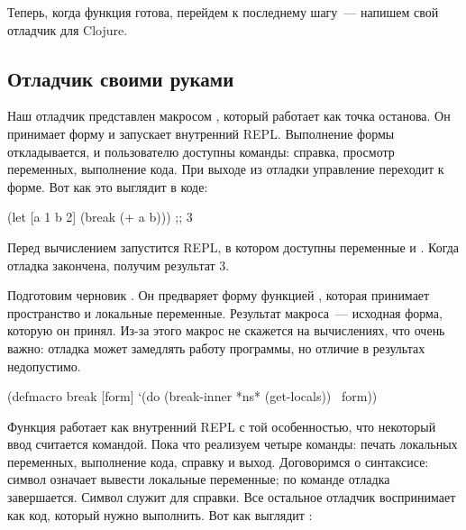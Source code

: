 \begin{english}
  \begin{clojure}
  \end{clojure}
\end{english}

Теперь, когда функция  готова, перейдем к последнему шагу~--- напишем свой отладчик для Clojure.

\subsection{Отладчик своими руками}


\label{section-own-debugger}


Наш отладчик представлен макросом , который работает как точка останова. Он принимает форму и запускает внутренний REPL. Выполнение формы откладывается, и пользователю доступны команды: справка, просмотр переменных, выполнение кода. При выходе из отладки управление переходит к форме. Вот как это выглядит в коде:

\begin{english}
  \begin{clojure}
(let [a 1
      b 2]
  (break (+ a b)))
;; 3
  \end{clojure}
\end{english}

Перед вычислением  запустится REPL, в котором доступны переменные  и . Когда отладка закончена, получим результат 3.

Подготовим черновик . Он предваряет форму функцией , которая принимает пространство и локальные переменные. Результат макроса~--- исходная форма, которую он принял. Из-за этого макрос не скажется на вычислениях, что очень важно: отладка может замедлять работу программы, но отличие в результах недопустимо.

\begin{english}
  \begin{clojure}
(defmacro break
  [form]
  `(do
     (break-inner *ns* (get-locals))
     ~form))
  \end{clojure}
\end{english}

Функция  работает как внутренний REPL с той особенностью, что некоторый ввод считается командой. Пока что реализуем четыре команды: печать локальных переменных, выполнение кода, справку и выход. Договоримся о синтаксисе: символ  означает вывести локальные переменные; по команде  отладка завершается. Символ  служит для справки. Все остальное отладчик воспринимает как код, который нужно выполнить. Вот как выглядит :

